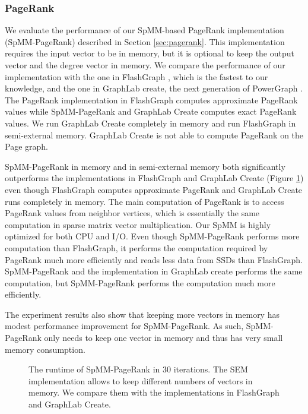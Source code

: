 \subsubsection{PageRank}
We evaluate the performance of our SpMM-based PageRank implementation
(SpMM-PageRank) described
in Section \ref{sec:pagerank}. This implementation requires the input vector
to be in memory, but it is optional to keep the output vector and the degree
vector in memory. We compare the performance of our implementation with
the one in FlashGraph \cite{flashgraph}, which is the fastest to our knowledge,
and the one in GraphLab create, the next generation of
PowerGraph \cite{powergraph}. The PageRank implementation in FlashGraph computes
approximate PageRank values while SpMM-PageRank and GraphLab Create computes
exact PageRank values. We run GraphLab Create completely in memory and run
FlashGraph in semi-external memory. GraphLab Create is not able to compute
PageRank on the Page graph.

SpMM-PageRank in memory and in semi-external memory both significantly outperforms
the implementations in FlashGraph and GraphLab Create (Figure \ref{perf:pagerank})
even though FlashGraph computes approximate PageRank and GraphLab Create runs
completely in memory. The main computation of PageRank is to access PageRank
values from neighbor vertices, which is essentially the same computation in
sparse matrix vector multiplication. Our SpMM is highly optimized for both CPU
and I/O. Even though SpMM-PageRank performs more computation than FlashGraph,
it performs the computation required by PageRank much more efficiently and
reads less data from SSDs than FlashGraph. SpMM-PageRank and the implementation
in GraphLab create performs the same computation, but SpMM-PageRank
performs the computation much more efficiently.

The experiment results also show that keeping more vectors in memory has modest
performance improvement for SpMM-PageRank. As such, SpMM-PageRank only needs
to keep one vector in memory and thus has very small memory consumption.

\begin{figure}
	\begin{center}
		\footnotesize
		
		\caption{The runtime of SpMM-PageRank in 30 iterations. The SEM
			implementation allows to keep different numbers of vectors in memory.
			We compare them with the implementations in FlashGraph and GraphLab
		Create.}
		\label{perf:pagerank}
	\end{center}
\end{figure}

